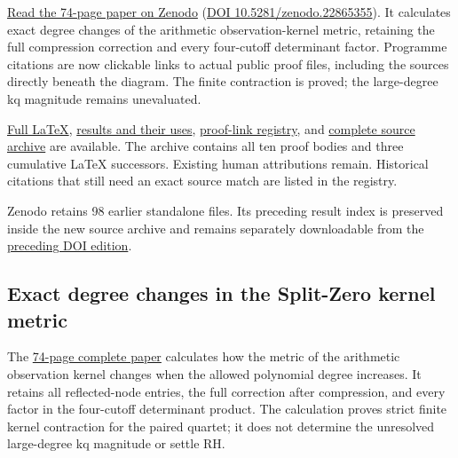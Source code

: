 \documentclass[
]{article}
\begin{document}
\href{https://zenodo.org/records/22865355}{Read the 74-page paper on
Zenodo} (\href{https://doi.org/10.5281/zenodo.22865355}{DOI
10.5281/zenodo.22865355}). It calculates exact degree changes of the
arithmetic observation-kernel metric, retaining the full compression
correction and every four-cutoff determinant factor. Programme citations
are now clickable links to actual public proof files, including the
sources directly beneath the diagram. The finite contraction is proved;
the large-degree kq magnitude remains unevaluated.

\href{https://github.com/KokunoYumeto/zeta-function-research-reader/blob/914b9aab530b7e6c1d112a236b51fa527c9c0538/workbenches/splitzero-tandem/continuations/20260921-kernel-degree-steps/COMPLETE_PROOFS.tex}{Full
LaTeX},
\href{https://github.com/KokunoYumeto/zeta-function-research-reader/blob/914b9aab530b7e6c1d112a236b51fa527c9c0538/workbenches/splitzero-tandem/continuations/20260921-kernel-degree-steps/RESULT_INDEX.json}{results
and their uses},
\href{https://github.com/KokunoYumeto/zeta-function-research-reader/blob/914b9aab530b7e6c1d112a236b51fa527c9c0538/workbenches/splitzero-tandem/continuations/20260921-kernel-degree-steps/CITATION_LINKS.json}{proof-link
registry}, and
\href{https://zenodo.org/records/22865355/files/101-splitzero-kernel-degree-sources.zip?download=1}{complete
source archive} are available. The archive contains all ten proof bodies
and three cumulative LaTeX successors. Existing human attributions
remain. Historical citations that still need an exact source match are
listed in the registry.

Zenodo retains 98 earlier standalone files. Its preceding result index
is preserved inside the new source archive and remains separately
downloadable from the
\href{https://zenodo.org/records/22864870}{preceding DOI edition}.

\subsection{Exact degree changes in the Split-Zero kernel
metric}\label{exact-degree-changes-in-the-split-zero-kernel-metric}

The
\href{https://github.com/KokunoYumeto/zeta-function-research-reader/blob/main/workbenches/splitzero-tandem/continuations/20260921-kernel-degree-steps/COMPLETE_PROOFS.pdf}{74-page
complete paper} calculates how the metric of the arithmetic observation
kernel changes when the allowed polynomial degree increases. It retains
all reflected-node entries, the full correction after compression, and
every factor in the four-cutoff determinant product. The calculation
proves strict finite kernel contraction for the paired quartet; it does
not determine the unresolved large-degree kq magnitude or settle RH.
\end{document}
